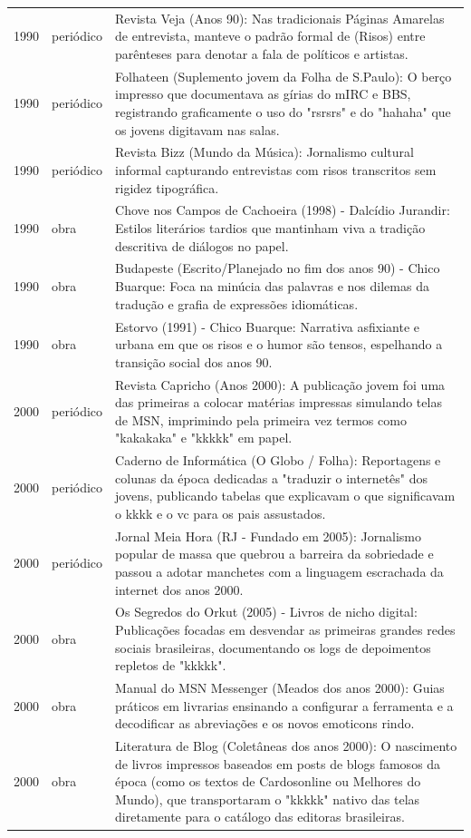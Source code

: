 \begin{longtable}{p{}p{}p{}}
1990 & periódico & Revista Veja (Anos 90): Nas tradicionais Páginas Amarelas de entrevista, manteve o padrão formal de (Risos) entre parênteses para denotar a fala de políticos e artistas. \\
1990 & periódico & Folhateen (Suplemento jovem da Folha de S.Paulo): O berço impresso que documentava as gírias do mIRC e BBS, registrando graficamente o uso do "rsrsrs" e do "hahaha" que os jovens digitavam nas salas. \\
1990 & periódico & Revista Bizz (Mundo da Música): Jornalismo cultural informal capturando entrevistas com risos transcritos sem rigidez tipográfica. \\
1990 & obra & Chove nos Campos de Cachoeira (1998) - Dalcídio Jurandir: Estilos literários tardios que mantinham viva a tradição descritiva de diálogos no papel. \\
1990 & obra & Budapeste (Escrito/Planejado no fim dos anos 90) - Chico Buarque: Foca na minúcia das palavras e nos dilemas da tradução e grafia de expressões idiomáticas. \\
1990 & obra & Estorvo (1991) - Chico Buarque: Narrativa asfixiante e urbana em que os risos e o humor são tensos, espelhando a transição social dos anos 90. \\
2000 & periódico & Revista Capricho (Anos 2000): A publicação jovem foi uma das primeiras a colocar matérias impressas simulando telas de MSN, imprimindo pela primeira vez termos como "kakakaka" e "kkkkk" em papel. \\
2000 & periódico & Caderno de Informática (O Globo / Folha): Reportagens e colunas da época dedicadas a "traduzir o internetês" dos jovens, publicando tabelas que explicavam o que significavam o kkkk e o vc para os pais assustados. \\
2000 & periódico & Jornal Meia Hora (RJ - Fundado em 2005): Jornalismo popular de massa que quebrou a barreira da sobriedade e passou a adotar manchetes com a linguagem escrachada da internet dos anos 2000. \\
2000 & obra & Os Segredos do Orkut (2005) - Livros de nicho digital: Publicações focadas em desvendar as primeiras grandes redes sociais brasileiras, documentando os logs de depoimentos repletos de "kkkkk". \\
2000 & obra & Manual do MSN Messenger (Meados dos anos 2000): Guias práticos em livrarias ensinando a configurar a ferramenta e a decodificar as abreviações e os novos emoticons rindo. \\
2000 & obra & Literatura de Blog (Coletâneas dos anos 2000): O nascimento de livros impressos baseados em posts de blogs famosos da época (como os textos de Cardosonline ou Melhores do Mundo), que transportaram o "kkkkk" nativo das telas diretamente para o catálogo das editoras brasileiras. \\
\bottomrule\end{longtable}\normalsize